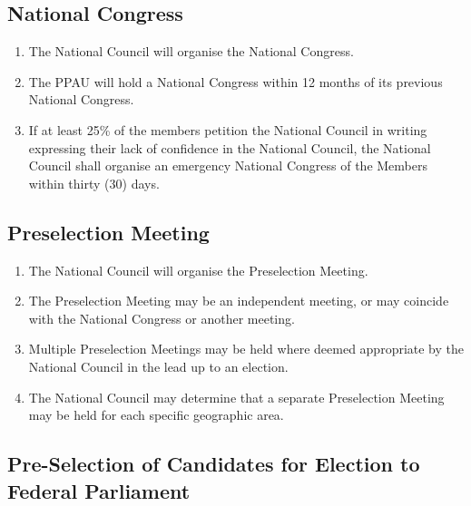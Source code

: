\documentclass[a4paper,titlepage,8.5pt]{article}
\begin{document}
\subsection{National Congress}

\begin{enumerate}
\item The National Council will organise the National Congress.
\item The PPAU will hold a National Congress within 12 months of its previous National Congress.
\item If at least 25\% of the members petition the National Council in writing expressing their lack of confidence in the National Council, the National Council shall organise an emergency National Congress of the Members within thirty (30) days. 
\end{enumerate}

\subsection{Preselection Meeting}

\begin{enumerate}
\item The National Council will organise the Preselection Meeting.
\item The Preselection Meeting may be an independent meeting, or may coincide with the National Congress or another meeting.
\item Multiple Preselection Meetings may be held where deemed appropriate by the National Council in the lead up to an election.
\item The National Council may determine that a separate Preselection Meeting may be held for each specific geographic area.
\end{enumerate}

\subsection{Pre-Selection of Candidates for Election to Federal Parliament}
\end{document}
